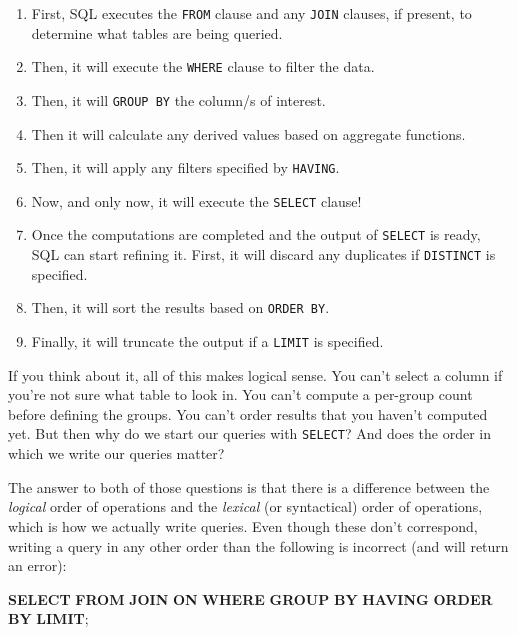 \documentclass[
]{book}
\newenvironment{Shaded}{\begin{snugshade}}{\end{snugshade}}
\newcommand{\KeywordTok}[1]{\textcolor[rgb]{0.13,0.29,0.53}{\textbf{#1}}}
\newcommand{\NormalTok}[1]{#1}
\providecommand{\tightlist}{%
  \setlength{\itemsep}{0pt}\setlength{\parskip}{0pt}}
\begin{document}
\begin{enumerate}
\def\labelenumi{\arabic{enumi}.}
\tightlist
\item
  First, SQL executes the \texttt{FROM} clause and any
  \texttt{JOIN} clauses, if present, to determine what tables are being queried.
\item
  Then, it will execute the \texttt{WHERE} clause to filter the data.
\item
  Then, it will \texttt{GROUP\ BY} the column/s of interest.
\item
  Then it will calculate any derived values based on aggregate functions.
\item
  Then, it will apply any filters specified by \texttt{HAVING}.
\item
  Now, and only now, it will execute the \texttt{SELECT} clause!
\item
  Once the computations are completed and the output of \texttt{SELECT} is ready,
  SQL can start refining it. First, it will discard any duplicates if \texttt{DISTINCT}
  is specified.
\item
  Then, it will sort the results based on \texttt{ORDER\ BY}.
\item
  Finally, it will truncate the output if a \texttt{LIMIT} is specified.
\end{enumerate}

If you think about it, all of this makes logical sense. You can't select a
column if you're not sure what table to look in. You can't compute a per-group
count before defining the groups. You can't order results that you haven't
computed yet. But then why do we start our queries with \texttt{SELECT}? And does the
order in which we write our queries matter?

The answer to both of those questions is that there is a difference between the
\emph{logical} order of operations and the \emph{lexical} (or syntactical) order of
operations, which is how we actually write queries. Even though these don't
correspond, writing a query in any other order than the following is incorrect
(and will return an error):

\begin{Shaded}
\begin{Highlighting}[]
\KeywordTok{SELECT} 
\KeywordTok{FROM} 
    \KeywordTok{JOIN} 
      \KeywordTok{ON} 
    \KeywordTok{WHERE} 
    \KeywordTok{GROUP} \KeywordTok{BY} 
    \KeywordTok{HAVING} 
    \KeywordTok{ORDER} \KeywordTok{BY} 
    \KeywordTok{LIMIT}\NormalTok{;}
\end{Highlighting}
\end{Shaded}
\end{document}
